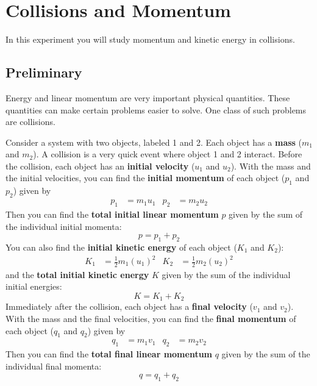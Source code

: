 \chapter{Collisions and Momentum}
%
In this experiment you will study momentum and kinetic energy in collisions.
%
\section{Preliminary}
%
Energy and linear momentum are very important physical quantities. These quantities can make certain problems easier to solve. One class of such problems are collisions.

Consider a system with two objects, labeled 1 and 2. Each object has a \textbf{mass} ($m_{1}$ and $m_{2}$). A collision is a very quick event where object 1 and 2 interact. Before the collision, each object has an \textbf{initial velocity} ($u_{1}$ and $u_{2}$). With the mass and the initial velocities, you can find the \textbf{initial momentum} of each object ($p_{1}$ and $p_{2}$) given by
\begin{align}
    p_{1} &= m_{1} u_{1} & p_{2} &= m_{2} u_{2}
\end{align}
Then you can find the \textbf{total initial linear momentum} $p$ given by the sum of the individual initial momenta:
\begin{equation}
    p = p_{1} + p_{2}
\end{equation}
You can also find the \textbf{initial kinetic energy} of each object ($K_{1}$ and $K_{2}$):
\begin{align}
    K_{1} &= \frac{1}{2} m_{1} \left(u_{1}\right)^{2} & K_{2} &= \frac{1}{2} m_{2} \left(u_{2}\right)^{2}
\end{align}
and the \textbf{total initial kinetic energy} $K$ given by the sum of the individual initial energies:
\begin{equation}
    K = K_{1} + K_{2}
\end{equation}
Immediately after the collision, each object has a \textbf{final velocity} ($v_{1}$ and $v_{2}$). With the mass and the final velocities, you can find the \textbf{final momentum} of each object ($q_{1}$ and $q_{2}$) given by
\begin{align}
    q_{1} &= m_{1} v_{1} & q_{2} &= m_{2} v_{2}
\end{align}
Then you can find the \textbf{total final linear momentum} $q$ given by the sum of the individual final momenta:
\begin{equation}
    q = q_{1} + q_{2}
\end{equation}
